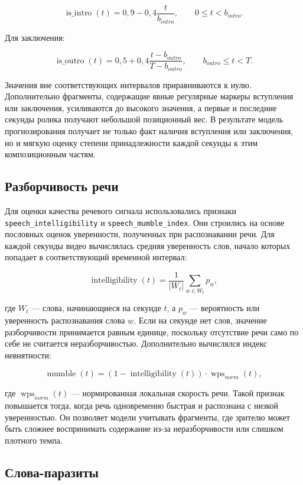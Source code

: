 \documentclass[times]{itmo-student-thesis}
\begin{document}
\[
\operatorname{is\_intro}(t)=0{,}9-0{,}4\frac{t}{b_{intro}}, \qquad 0\le t<b_{intro}.
\]

Для заключения:

\[
\operatorname{is\_outro}(t)=0{,}5+0{,}4\frac{t-b_{outro}}{T-b_{outro}}, \qquad b_{outro}\le t<T.
\]

Значения вне соответствующих интервалов приравниваются к нулю. Дополнительно фрагменты, содержащие явные регулярные маркеры вступления или заключения, усиливаются до высокого значения, а первые и последние секунды ролика получают небольшой позиционный вес. В результате модель прогнозирования получает не только факт наличия вступления или заключения, но и мягкую оценку степени принадлежности каждой секунды к этим композиционным частям.

\subsection{Разборчивость речи}

Для оценки качества речевого сигнала использовались признаки \texttt{speech\_intelligibility} и \texttt{speech\_mumble\_index}. Они строились на основе пословных оценок уверенности, полученных при распознавании речи. Для каждой секунды видео вычислялась средняя уверенность слов, начало которых попадает в соответствующий временной интервал:

\[
\operatorname{intelligibility}(t)=\frac{1}{|W_t|}\sum_{w\in W_t}p_w,
\]

где $W_t$ — слова, начинающиеся на секунде $t$, а $p_w$ — вероятность или уверенность распознавания слова $w$. Если на секунде нет слов, значение разборчивости принимается равным единице, поскольку отсутствие речи само по себе не считается неразборчивостью. Дополнительно вычислялся индекс невнятности:

\[
\operatorname{mumble}(t)=(1-\operatorname{intelligibility}(t))\cdot \operatorname{wps}_{norm}(t),
\]

где $\operatorname{wps}_{norm}(t)$ — нормированная локальная скорость речи. Такой признак повышается тогда, когда речь одновременно быстрая и распознана с низкой уверенностью. Он позволяет модели учитывать фрагменты, где зрителю может быть сложнее воспринимать содержание из-за неразборчивости или слишком плотного темпа.

\subsection{Слова-паразиты}
\end{document}
